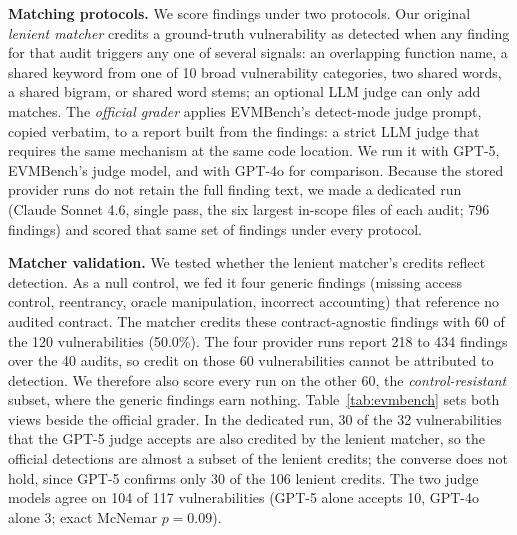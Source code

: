 \documentclass[conference]{IEEEtran}
\begin{document}
\textbf{Matching protocols.} We score findings under two protocols. Our original \emph{lenient matcher} credits a ground-truth vulnerability as detected when any finding for that audit triggers any one of several signals: an overlapping function name, a shared keyword from one of 10 broad vulnerability categories, two shared words, a shared bigram, or shared word stems; an optional LLM judge can only add matches. The \emph{official grader} applies EVMBench's detect-mode judge prompt, copied verbatim, to a report built from the findings: a strict LLM judge that requires the same mechanism at the same code location. We run it with GPT-5, EVMBench's judge model, and with GPT-4o for comparison. Because the stored provider runs do not retain the full finding text, we made a dedicated run (Claude Sonnet 4.6, single pass, the six largest in-scope files of each audit; 796 findings) and scored that same set of findings under every protocol.

\textbf{Matcher validation.} We tested whether the lenient matcher's credits reflect detection. As a null control, we fed it four generic findings (missing access control, reentrancy, oracle manipulation, incorrect accounting) that reference no audited contract. The matcher credits these contract-agnostic findings with 60 of the 120 vulnerabilities (50.0\%). The four provider runs report 218 to 434 findings over the 40 audits, so credit on those 60 vulnerabilities cannot be attributed to detection. We therefore also score every run on the other 60, the \emph{control-resistant} subset, where the generic findings earn nothing. Table~\ref{tab:evmbench} sets both views beside the official grader. In the dedicated run, 30 of the 32 vulnerabilities that the GPT-5 judge accepts are also credited by the lenient matcher, so the official detections are almost a subset of the lenient credits; the converse does not hold, since GPT-5 confirms only 30 of the 106 lenient credits. The two judge models agree on 104 of 117 vulnerabilities (GPT-5 alone accepts 10, GPT-4o alone 3; exact McNemar $p=0.09$).
\end{document}
